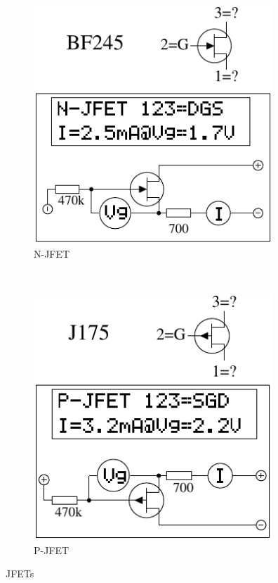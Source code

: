 \begin{figure}[H]
  \begin{subfigure}[b]{9cm}
    \centering
    \includegraphics[width=9cm]{../FIG/JFET_BF245.pdf}
    \caption{N-JFET}
    \label{fig:N-JFET}
  \end{subfigure}
  ~
  \begin{subfigure}[b]{9cm}
    \centering
    \includegraphics[width=9cm]{../FIG/JFET_J175.pdf}
    \caption{P-JFET}
    \label{fig:P-JFET}
  \end{subfigure}
  \caption{JFETs}
\end{figure}



